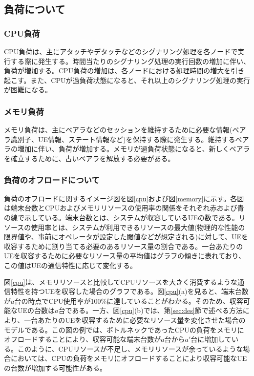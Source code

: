 \documentclass[a4j]{ujarticle}
\begin{document}
\subsection{負荷について}
\subsubsection{CPU負荷}
CPU負荷は、主にアタッチやデタッチなどのシグナリング処理を各ノードで実行する際に発生する。時間当たりのシグナリング処理の実行回数の増加に伴い、負荷が増加する。CPU負荷の増加は、各ノードにおける処理時間の増大を引き起こす。また、CPUが過負荷状態になると、それ以上のシグナリング処理の実行が困難になる。
\subsubsection{メモリ負荷}
メモリ負荷は、主にベアラなどのセッションを維持するために必要な情報(ベアラ識別子、UE情報、ステート情報など)を保持する際に発生する。維持するベアラの増加に伴い、負荷が増加する。メモリが過負荷状態になると、新しくベアラを確立するために、古いベアラを解放する必要がある。
\subsubsection{負荷のオフロードについて}
負荷のオフロードに関するイメージ図を図\ref{cpu}および図\ref{memory}に示す。各図は端末台数とCPUおよびメモリリソースの使用率の関係をそれぞれ赤および青の線で示している。端末台数とは、システムが収容しているUEの数である。リソースの使用率とは、システムが利用できるリソースの最大値(物理的な性能の限界値や、事前にオペレータが設定した閾値などが想定される)に対して、UEを収容するために割り当てる必要のあるリソース量の割合である。一台あたりのUEを収容するために必要なリソース量の平均値はグラフの傾きに表れており、この値はUEの通信特性に応じて変化する。

図\ref{cpu}は、メモリリソースと比較してCPUリソースを大きく消費するような通信特性を持つUEを収容した場合のグラフである。図\ref{cpu}(a)を見ると、端末台数が$a$台の時点でCPU使用率が100\%に達していることがわかる。そのため、収容可能なUEの台数は$a$台である。一方、図\ref{cpu}(b)では、第\ref{sec:des}節で述べる方法により、一台あたりのUEを収容するために必要なリソース量を変化させた場合のモデルである。この図の例では、ボトルネックであったCPUの負荷をメモリにオフロードすることにより、収容可能な端末台数が$a$台から$a'$台に増加している。このように、CPUリソースが不足し、メモリリソースが余っているような場合においては、CPUの負荷をメモリにオフロードすることにより収容可能なUEの台数が増加する可能性がある。
\end{document}
